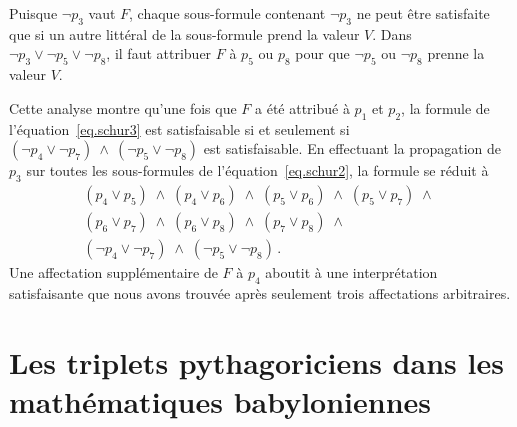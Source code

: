 Puisque $\neg p_3$ vaut $F$, chaque sous-formule contenant $\neg p_3$ ne peut être satisfaite que si un autre littéral de la sous-formule prend la valeur $V$. Dans $\neg p_3 \vee \neg p_5 \vee \neg p_8$, il faut attribuer $F$ à $p_5$ ou $p_8$ pour que $\neg p_5$ ou $\neg p_8$ prenne la valeur $V$.

Cette analyse montre qu'une fois que $F$ a été attribué à $p_1$ et $p_2$, la formule de l'équation~\ref{eq.schur3} est satisfaisable si et seulement si $(\neg p_4 \vee \neg p_7) \:\wedge\  (\neg p_5 \vee \neg p_8)$ est satisfaisable. En effectuant la propagation de $p_3$ sur toutes les sous-formules de l'équation~\ref{eq.schur2}, la formule se réduit à 
\[
\begin{array}{l}
(p_4\vee p_5)\;\wedge\;(p_4\vee p_6)\;\wedge\;(p_5\vee p_6)\;\wedge\;(p_5\vee p_7)\;\wedge\;\\
(p_6\vee p_7)\;\wedge\;(p_6\vee p_8)\;\wedge\;(p_7\vee p_8)\;\wedge\\
(\neg p_4\vee \neg p_7)\;\wedge\;
(\neg p_5\vee \neg p_8)\,.
\end{array}
\]
Une affectation supplémentaire de $F$ à $p_4$ aboutit à une interprétation satisfaisante que nous avons trouvée après seulement trois affectations arbitraires.


\section{Les triplets pythagoriciens dans les mathématiques babyloniennes}\label{s.plimpton}

